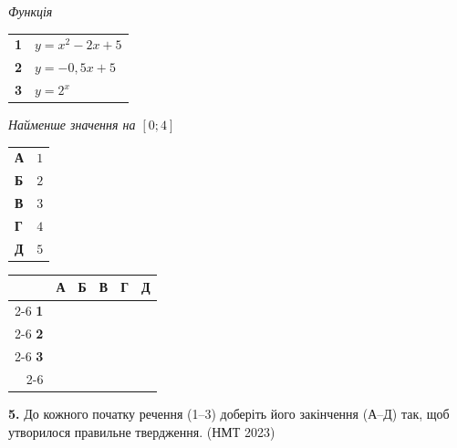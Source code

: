 \documentclass[14pt]{extarticle}
\newcommand{\answerGrid}{
    \begingroup
    \setlength{\tabcolsep}{4pt}
    \renewcommand{\arraystretch}{1.2}
    \small
    \begin{tabular}{r|c|c|c|c|c|}
         \multicolumn{1}{c}{} & \multicolumn{1}{c}{\textbf{А}} & \multicolumn{1}{c}{\textbf{Б}} & \multicolumn{1}{c}{\textbf{В}} & \multicolumn{1}{c}{\textbf{Г}} & \multicolumn{1}{c}{\textbf{Д}} \\ \cline{2-6}
         \textbf{1} & & & & & \\ \cline{2-6}
         \textbf{2} & & & & & \\ \cline{2-6}
         \textbf{3} & & & & & \\ \cline{2-6}
    \end{tabular}
    \endgroup
}
\newcommand{\nmtyear}[1]{\hfill{\small\color{yearcolor}(НМТ #1)}}
\begin{document}
\noindent
\begin{minipage}[t]{0.45\textwidth}
    \textit{Функція} \par \vspace{0.2cm}
    \begin{tabular}{@{}p{0.5cm} l@{}}
    \textbf{1} & $y = x^2 - 2x + 5$ \\[0.4cm]
    \textbf{2} & $y = -0{,}5x + 5$ \\[0.4cm]
    \textbf{3} & \colorbox{yellow!30}{$y = 2^x$} \\
    \end{tabular}
\end{minipage}%
\hfill
\begin{minipage}[t]{0.50\textwidth}
    \textit{Найменше значення на $[0; 4]$} \par \vspace{0.2cm}
    \begin{tabular}{@{}p{0.5cm} p{7cm}@{}}
    \textbf{А} & $1$ \\[0.2cm]
    \textbf{Б} & $2$ \\[0.2cm]
    \textbf{В} & $3$ \\[0.2cm]
    \textbf{Г} & $4$ \\[0.2cm]
    \textbf{Д} & $5$ \\
    \end{tabular}
\end{minipage}
\vspace{0.3cm}

\answerGrid
\vspace{0.7cm}

\noindent\textbf{5.} До кожного початку речення (1–3) доберіть його закінчення (А–Д) так, щоб утворилося правильне твердження. \nmtyear{2023}
\vspace{0.3cm}
\end{document}
